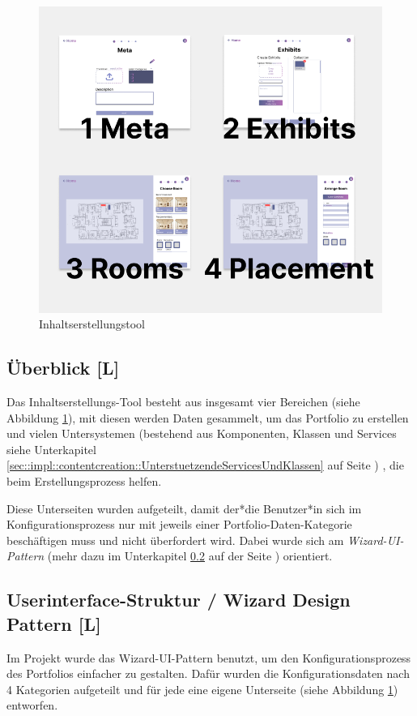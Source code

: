 \begin{figure}
    \centering
    \includegraphics[scale=0.5]{pics/CreateCreation4Categories.png}
    \caption{Inhaltserstellungstool}
    \label{fig:impl:creation:fourCategoires}
\end{figure}

\subsection{Überblick [L]}
Das Inhaltserstellungs-Tool besteht aus insgesamt vier Bereichen (siehe Abbildung \ref{fig:impl:creation:fourCategoires}), mit diesen werden Daten gesammelt, um das Portfolio zu erstellen und vielen Untersystemen (bestehend aus Komponenten, Klassen und Services siehe Unterkapitel \ref{sec::impl::contentcreation::UnterstuetzendeServicesUndKlassen} auf Seite \pageref{sec::impl::contentcreation::UnterstuetzendeServicesUndKlassen}) , die beim Erstellungsprozess helfen.

Diese Unterseiten wurden aufgeteilt, damit der*die Benutzer*in sich im Konfigurationsprozess nur mit jeweils einer Portfolio-Daten-Kategorie beschäftigen muss und nicht überfordert wird. Dabei wurde sich  am \emph{Wizard-UI-Pattern} (mehr dazu im Unterkapitel \ref{sec::contentcreation::wizard} auf der Seite \pageref{sec::contentcreation::wizard}) orientiert.

\subsection{Userinterface-Struktur / Wizard Design Pattern [L]}
\label{sec::contentcreation::wizard}
Im Projekt wurde das Wizard-UI-Pattern benutzt, um den Konfigurationsprozess des Portfolios einfacher zu gestalten. Dafür wurden die Konfigurationsdaten nach 4 Kategorien aufgeteilt und für jede eine eigene Unterseite (siehe Abbildung \ref{fig:impl:creation:fourCategoires}) entworfen.

